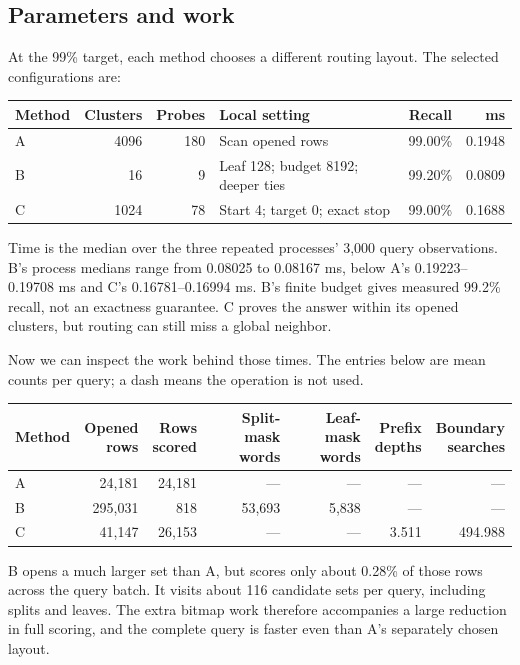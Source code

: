 \subsection{Parameters and work}
At the 99\% target, each method chooses a different routing layout. The selected configurations are:
\begin{center}\small
\begin{tabularx}{\linewidth}{@{}lrrYrr@{}}\toprule
Method & Clusters & Probes & Local setting & Recall & ms\\\midrule
A & 4096 & 180 & Scan opened rows & 99.00\% & 0.1948\\
B & 16 & 9 & Leaf 128; budget 8192; deeper ties & 99.20\% & 0.0809\\
C & 1024 & 78 & Start 4; target 0; exact stop & 99.00\% & 0.1688\\\bottomrule
\end{tabularx}
\end{center}
Time is the median over the three repeated processes' 3,000 query observations. B's process medians range from 0.08025 to 0.08167 ms, below A's 0.19223--0.19708 ms and C's 0.16781--0.16994 ms. B's finite budget gives measured 99.2\% recall, not an exactness guarantee. C proves the answer within its opened clusters, but routing can still miss a global neighbor.

Now we can inspect the work behind those times. The entries below are mean counts per query; a dash means the operation is not used.
\begin{center}\small
\begin{tabular}{@{}lrrrrrr@{}}\toprule
Method & \shortstack{Opened\\rows} & \shortstack{Rows\\scored} & \shortstack{Split-mask\\words} & \shortstack{Leaf-mask\\words} & \shortstack{Prefix\\depths} & \shortstack{Boundary\\searches}\\\midrule
A & 24,181 & 24,181 & --- & --- & --- & ---\\
B & 295,031 & 818 & 53,693 & 5,838 & --- & ---\\
C & 41,147 & 26,153 & --- & --- & 3.511 & 494.988\\\bottomrule
\end{tabular}
\end{center}
B opens a much larger set than A, but scores only about 0.28\% of those rows across the query batch. It visits about 116 candidate sets per query, including splits and leaves. The extra bitmap work therefore accompanies a large reduction in full scoring, and the complete query is faster even than A's separately chosen layout.

